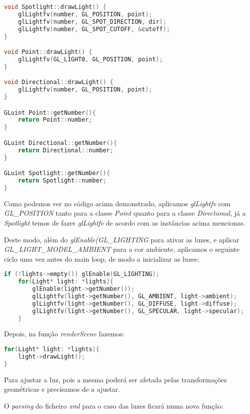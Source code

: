 \documentclass[14pt, a4 paper]{report}
\begin{document}
\begin{lstlisting}[language=c++]
void Spotlight::drawLight() {
    glLightfv(number, GL_POSITION, point);
    glLightfv(number, GL_SPOT_DIRECTION, dir);
    glLightfv(number, GL_SPOT_CUTOFF, &cutoff);
}

void Point::drawLight() {
    glLightfv(GL_LIGHT0, GL_POSITION, point);
}

void Directional::drawLight() {
    glLightfv(number, GL_POSITION, point);
}

GLuint Point::getNumber(){
    return Point::number;
}

GLuint Directional::getNumber(){
    return Directional::number;
}

GLuint Spotlight::getNumber(){
    return Spotlight::number;
}
\end{lstlisting}

Como podemos ver no código acima demonstrado, aplicamos \textit{glLightfv} com \textit{GL\_POSITION} tanto para a classe \textit{Point} quanto para a classe \textit{Directional}, já a \textit{Spotlight} temos de fazer \textit{glLightfv} de acordo com as instâncias acima mencionas.

Deste modo, além do \textit{glEnable(GL\_LIGHTING} para ativar as luzes, e aplicar \textit{GL\_LIGHT\_MODEL\_AMBIENT} para a cor ambiente, aplicamos o seguinte ciclo uma vez antes do main loop, de modo a inicializar as luzes:

\begin{lstlisting}[language = c++]
if (!lights->empty()) glEnable(GL_LIGHTING);
	for(Light* light: *lights){
		glEnable(light->getNumber());
		glLightfv(light->getNumber(), GL_AMBIENT, light->ambient);
		glLightfv(light->getNumber(), GL_DIFFUSE, light->diffuse);
		glLightfv(light->getNumber(), GL_SPECULAR, light->specular);
	}
\end{lstlisting}

Depois, na função \textit{renderScene} fazemos:
\begin{lstlisting}[language = c++]
for(Light* light: *lights){
    light->drawLight();
}
\end{lstlisting}
Para ajustar a luz, pois a mesma poderá ser afetada pelas transformações geométricas e precisamos de a ajustar.

O \textit{parsing} do ficheiro \textit{xml} para o caso das luzes ficará numa nova função:
\end{document}
